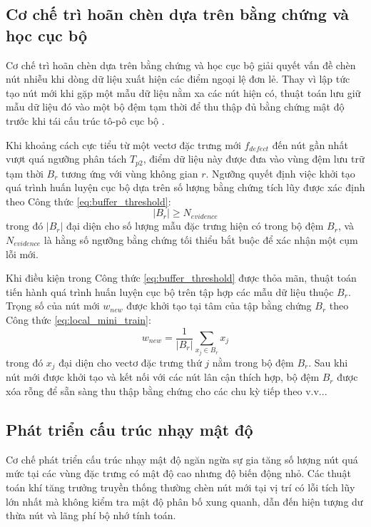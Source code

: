 \subsection{Cơ chế trì hoãn chèn dựa trên bằng chứng và học cục bộ}
\label{subsec:deferred_insertion}

Cơ chế trì hoãn chèn dựa trên bằng chứng và học cục bộ giải quyết vấn đề chèn nút nhiễu khi dòng dữ liệu xuất hiện các điểm ngoại lệ đơn lẻ. Thay vì lập tức tạo nút mới khi gặp một mẫu dữ liệu nằm xa các nút hiện có, thuật toán lưu giữ mẫu dữ liệu đó vào một bộ đệm tạm thời để thu thập đủ bằng chứng mật độ trước khi tái cấu trúc tô-pô cục bộ \cite{penev1998local}.

Khi khoảng cách cực tiểu từ một vectơ đặc trưng mới $f_{defect}$ đến nút gần nhất vượt quá ngưỡng phân tách $T_{p2}$, điểm dữ liệu này được đưa vào vùng đệm lưu trữ tạm thời $B_r$ tương ứng với vùng không gian $r$. Ngưỡng quyết định việc khởi tạo quá trình huấn luyện cục bộ dựa trên số lượng bằng chứng tích lũy được xác định theo Công thức \ref{eq:buffer_threshold}:
\begin{equation}
\label{eq:buffer_threshold}
|B_r| \ge N_{evidence}
\end{equation}
trong đó $|B_r|$ đại diện cho số lượng mẫu đặc trưng hiện có trong bộ đệm $B_r$, và $N_{evidence}$ là hằng số ngưỡng bằng chứng tối thiểu bắt buộc để xác nhận một cụm lỗi mới.

Khi điều kiện trong Công thức \ref{eq:buffer_threshold} được thỏa mãn, thuật toán tiến hành quá trình huấn luyện cục bộ trên tập hợp các mẫu dữ liệu thuộc $B_r$. Trọng số của nút mới $w_{new}$ được khởi tạo tại tâm của tập bằng chứng $B_r$ theo Công thức \ref{eq:local_mini_train}:
\begin{equation}
\label{eq:local_mini_train}
w_{new} = \frac{1}{|B_r|} \sum_{x_j \in B_r} x_j
\end{equation}
trong đó $x_j$ đại diện cho vectơ đặc trưng thứ $j$ nằm trong bộ đệm $B_r$. Sau khi nút mới được khởi tạo và kết nối với các nút lân cận thích hợp, bộ đệm $B_r$ được xóa rỗng để sẵn sàng thu thập bằng chứng cho các chu kỳ tiếp theo v.v...

\subsection{Phát triển cấu trúc nhạy mật độ}
\label{subsec:density_aware_growth}

Cơ chế phát triển cấu trúc nhạy mật độ ngăn ngừa sự gia tăng số lượng nút quá mức tại các vùng đặc trưng có mật độ cao nhưng độ biến động nhỏ. Các thuật toán khí tăng trưởng truyền thống thường chèn nút mới tại vị trí có lỗi tích lũy lớn nhất mà không kiểm tra mật độ phân bố xung quanh, dẫn đến hiện tượng dư thừa nút và lãng phí bộ nhớ tính toán.

